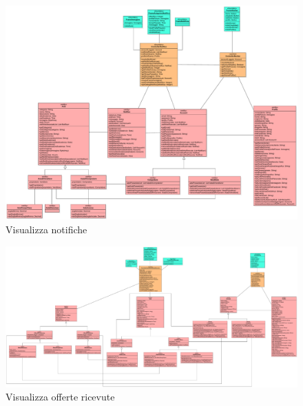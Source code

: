         \begin{figure}[htbp!]
            \centering
                \includegraphics[width=1\linewidth]{Immagini/Diagrammi/Class Diagram/Analisi/Utente che ha effettuato l'accesso/VisualizzaNotifiche.pdf}
            \caption{Visualizza notifiche}
        \end{figure}
        
        \begin{figure}[htbp!]
            \centering
                \includegraphics[width=1\linewidth]{Immagini/Diagrammi/Class Diagram/Analisi/Utente che ha effettuato l'accesso/VisualizzaOfferteRicevute.pdf}
            \caption{Visualizza offerte ricevute}
        \end{figure}
        
